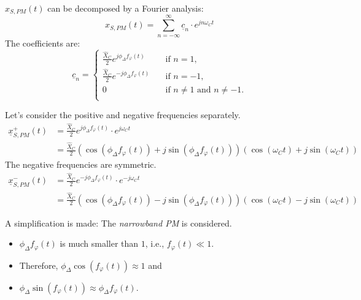 \begin{refsection}
$x_{S,PM}(t)$ can be decomposed by a Fourier analysis:
\begin{equation}
	x_{S,PM}(t) = \sum_{n=-\infty}^{\infty} \underline{c}_n \cdot e^{j n \omega_C t}
\end{equation}
The coefficients are:
\begin{equation}
	\underline{c}_n = \begin{cases}
		\frac{\hat{X}_C}{2} e^{j \phi_{\Delta} f_{\varphi}(t)} &\quad \text{if } n = 1, \\
		\frac{\hat{X}_C}{2} e^{-j \phi_{\Delta} f_{\varphi}(t)} &\quad \text{if } n = -1, \\
		0 &\quad \text{if } n \neq 1 \text{ and } n \neq -1. \\
	\end{cases}
\end{equation}

Let's consider the positive and negative frequencies separately.
\begin{equation}
	\begin{split}
		\underline{x}_{S,PM}^{+}(t) &= \frac{\hat{X}_C}{2} e^{j \phi_{\Delta} f_{\varphi}(t)} \cdot e^{j \omega_C t} \\
		 &= \frac{\hat{X}_C}{2} \left(\cos\left(\phi_{\Delta} f_{\varphi}(t)\right) + j \sin\left(\phi_{\Delta} f_{\varphi}(t)\right)\right) \left(\cos\left(\omega_C t\right) + j \sin\left(\omega_C t\right)\right)
	\end{split}
	\label{eq:ch05:pm_fourier_pos}
\end{equation}
The negative frequencies are symmetric.
\begin{equation}
	\begin{split}
		\underline{x}_{S,PM}^{-}(t) &= \frac{\hat{X}_C}{2} e^{-j \phi_{\Delta} f_{\varphi}(t)} \cdot e^{-j \omega_C t} \\
		&= \frac{\hat{X}_C}{2} \left(\cos\left(\phi_{\Delta} f_{\varphi}(t)\right) - j \sin\left(\phi_{\Delta} f_{\varphi}(t)\right)\right) \left(\cos\left(\omega_C t\right) - j \sin\left(\omega_C t\right)\right)
	\end{split}
	\label{eq:ch05:pm_fourier_neg}
\end{equation}

A simplification is made: The \emph{narrowband \ac{PM}} is considered.
\begin{itemize}
	\item $\phi_{\Delta} f_{\varphi}(t)$ is much smaller than $1$, i.e., $f_{\varphi}(t) \ll 1$.
	\item Therefore, $\phi_{\Delta} \cos\left(f_{\varphi}(t)\right) \approx 1$ and
	\item $\phi_{\Delta} \sin\left(f_{\varphi}(t)\right) \approx \phi_{\Delta} f_{\varphi}(t)$.
\end{itemize}


\end{refsection}
